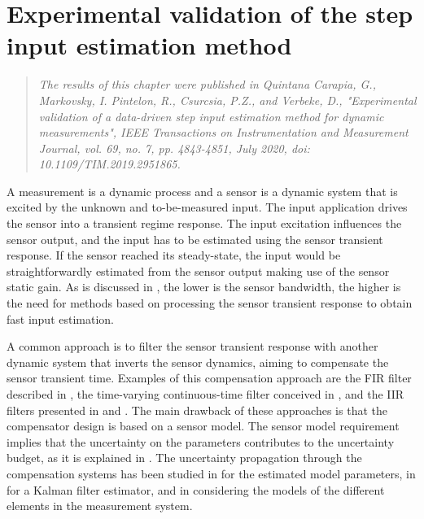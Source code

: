 \glsresetall

\chapter{Experimental validation of the step input estimation method }\label{chap:ExperimentalValidation}


\begin{quote}
\emph{The results of this chapter were published in Quintana Carapia, G., Markovsky, I. Pintelon, R., Csurcsia, P.Z., and Verbeke, D., "Experimental validation of a data-driven step input estimation method for dynamic measurements", IEEE Transactions on Instrumentation and Measurement Journal, \color{blue} vol. 69, no. 7, pp. 4843-4851, July 2020, \color{black} doi: 10.1109/TIM.2019.2951865. \nocite{QuintanaTIM} } %
\end{quote}

\vfill{}


A measurement is a dynamic process \color{blue} and a sensor is a dynamic system that is excited by the unknown and to-be-measured input.
The input application drives the sensor into a transient regime response.
The input excitation influences the sensor output, and the input has to be estimated using the sensor transient response.
If the sensor reached its steady-state, the input would be straightforwardly estimated from the sensor output making use of the sensor static gain.
As is discussed in \citet{Dienstfrey14}, the lower is the sensor bandwidth, the higher is the need for methods based on processing the sensor transient response to obtain fast input estimation.

A common approach is to filter the sensor transient response with another dynamic system that inverts the sensor dynamics, aiming to compensate the sensor transient time.
Examples of this compensation approach are the FIR filter described in \citet{Elster07}, the time-varying continuous-time filter conceived in \citet{Piskorowski08}, and the IIR filters presented in \citet{Link09} and \citet{Eichstadt10}. 
The main drawback of these approaches is that the compensator design is based on a sensor model.
The sensor model requirement implies that the uncertainty on the parameters contributes to the uncertainty budget, as it is explained in \citet{Hessling11}.
The uncertainty propagation through the compensation systems has been studied in \citet{Elster07, Link07} for the estimated model parameters, in \citet{Eichstadt16b} for a Kalman filter estimator, and in \citet{DEmilia16} considering the models of the different elements in the measurement system\color{black}.



